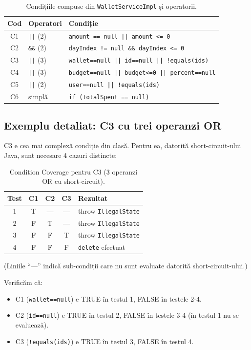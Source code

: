 \begin{table}[!htb]
\centering
\caption{Condițiile compuse din \texttt{WalletServiceImpl} și operatorii.}
\label{tab:conditions}
\begin{tabularx}{\linewidth}{clX}
\toprule
\textbf{Cod} & \textbf{Operatori} & \textbf{Condiție} \\
\midrule
C1 & \texttt{||} (2) & \texttt{amount == null || amount <= 0} \\
C2 & \texttt{\&\&} (2) & \texttt{dayIndex != null \&\& dayIndex <= 0} \\
C3 & \texttt{||} (3) & \texttt{wallet==null || id==null || !equals(ids)} \\
C4 & \texttt{||} (3) & \texttt{budget==null || budget<=0 || percent==null} \\
C5 & \texttt{||} (2) & \texttt{user==null || !equals(ids)} \\
C6 & simplă & \texttt{if (totalSpent == null)} \\
\bottomrule
\end{tabularx}
\end{table}

\subsection{Exemplu detaliat: C3 cu trei operanzi OR}

C3 e cea mai complexă condiție din clasă. Pentru ea, datorită short-circuit-ului Java, sunt necesare 4 cazuri distincte:

\begin{table}[!htb]
\centering
\caption{Condition Coverage pentru C3 (3 operanzi OR cu short-circuit).}
\label{tab:cond-c3}
\begin{tabular}{cccc l}
\toprule
\textbf{Test} & \textbf{C1} & \textbf{C2} & \textbf{C3} & \textbf{Rezultat} \\
\midrule
1 & T & --- & --- & throw \texttt{IllegalState} \\
2 & F & T & --- & throw \texttt{IllegalState} \\
3 & F & F & T & throw \texttt{IllegalState} \\
4 & F & F & F & \texttt{delete} efectuat \\
\bottomrule
\end{tabular}
\end{table}

(Liniile \enquote{---} indică sub-condiții care nu sunt evaluate datorită short-circuit-ului.)

Verificăm că:
\begin{itemize}
    \item C1 (\texttt{wallet==null}) e TRUE în testul 1, FALSE în testele 2-4.
    \item C2 (\texttt{id==null}) e TRUE în testul 2, FALSE în testele 3-4 (în testul 1 nu se evaluează).
    \item C3 (\texttt{!equals(ids)}) e TRUE în testul 3, FALSE în testul 4.
\end{itemize}

